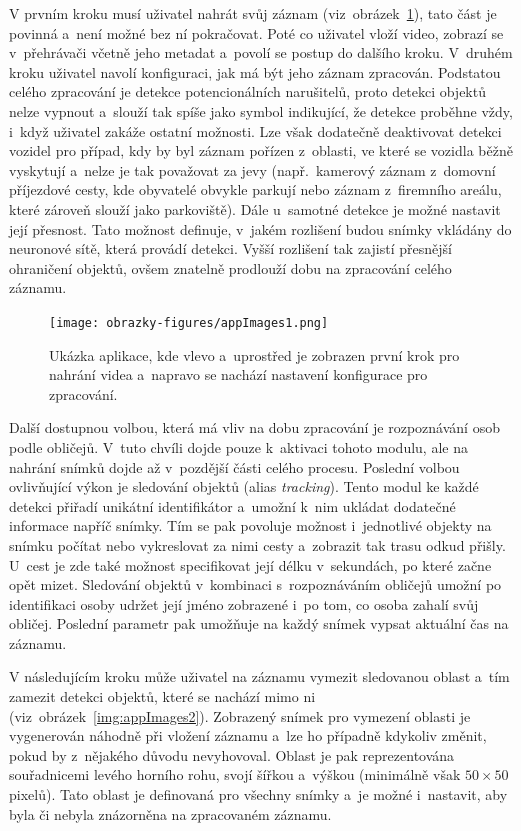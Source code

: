 V prvním kroku musí uživatel nahrát svůj záznam (viz~obrázek~\ref{img:appImages1}), tato část je povinná a~není možné bez ní pokračovat. Poté co uživatel vloží video, zobrazí se v~přehrávači včetně jeho metadat a~povolí se postup do dalšího kroku. V~druhém kroku uživatel navolí konfiguraci, jak má být jeho záznam zpracován. Podstatou celého zpracování je detekce potencionálních narušitelů, proto detekci objektů nelze vypnout a~slouží tak spíše jako symbol indikující, že detekce proběhne vždy, i~když uživatel zakáže ostatní možnosti. Lze však dodatečně deaktivovat detekci vozidel pro případ, kdy by byl záznam pořízen z~oblasti, ve které se vozidla běžně vyskytují a~nelze je tak považovat za  jevy (např.~kamerový záznam z~domovní příjezdové cesty, kde obyvatelé obvykle parkují nebo záznam z~firemního areálu, které zároveň slouží jako parkoviště). Dále u~samotné detekce je možné nastavit její přesnost. Tato možnost definuje, v~jakém rozlišení budou snímky vkládány do neuronové sítě, která provádí detekci. Vyšší rozlišení tak zajistí přesnější ohraničení objektů, ovšem znatelně prodlouží dobu na zpracování celého záznamu.

\begin{figure}[hbt]
	\centering
	\setlength{\fboxsep}{0pt}
	\texttt{[image: obrazky-figures/appImages1.png]}
	\caption{Ukázka aplikace, kde vlevo a~uprostřed je zobrazen první krok pro nahrání videa a~napravo se nachází nastavení konfigurace pro zpracování.}
	\label{img:appImages1}
\end{figure}

Další dostupnou volbou, která má vliv na dobu zpracování je rozpoznávání osob podle obličejů. V~tuto chvíli dojde pouze k~aktivaci tohoto modulu, ale na nahrání snímků dojde až v~pozdější části celého procesu. Poslední volbou ovlivňující výkon je sledování objektů (alias \emph{tracking}). Tento modul ke každé detekci přiřadí unikátní identifikátor a~umožní k~nim ukládat dodatečné informace napříč snímky. Tím se pak povoluje možnost i~jednotlivé objekty na snímku počítat nebo vykreslovat za nimi cesty a~zobrazit tak trasu odkud přišly. U~cest je zde také možnost specifikovat její délku v~sekundách, po které začne opět mizet. Sledování objektů v~kombinaci s~rozpoznáváním obličejů umožní po identifikaci osoby udržet její jméno zobrazené i~po tom, co osoba zahalí svůj obličej. Poslední parametr pak umožňuje na každý snímek vypsat aktuální čas na záznamu.

V následujícím kroku může uživatel na záznamu vymezit sledovanou oblast a~tím zamezit detekci objektů, které se nachází mimo ni (viz~obrázek~\ref{img:appImages2}). Zobrazený snímek pro vymezení oblasti je vygenerován náhodně při vložení záznamu a~lze ho případně kdykoliv změnit, pokud by z~nějakého důvodu nevyhovoval. Oblast je pak reprezentována souřadnicemi levého horního rohu, svojí šířkou a~výškou (minimálně však $50\times50$ pixelů). Tato oblast je definovaná pro všechny snímky a~je možné i~nastavit, aby byla či nebyla znázorněna na zpracovaném záznamu.

